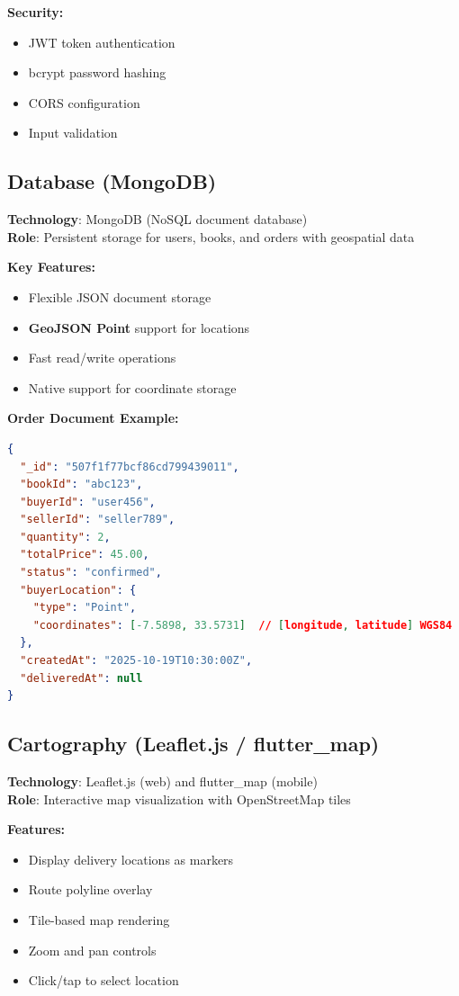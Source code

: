\documentclass[12pt,a4paper]{article}
\begin{document}
\textbf{Security:}
\begin{itemize}
    \item JWT token authentication
    \item bcrypt password hashing
    \item CORS configuration
    \item Input validation
\end{itemize}

\subsection{Database (MongoDB)}

\textbf{Technology}: MongoDB (NoSQL document database)\\
\textbf{Role}: Persistent storage for users, books, and orders with geospatial data

\textbf{Key Features:}
\begin{itemize}
    \item Flexible JSON document storage
    \item \textbf{GeoJSON Point} support for locations
    \item Fast read/write operations
    \item Native support for coordinate storage
\end{itemize}

\textbf{Order Document Example:}
\begin{lstlisting}[language=json, caption={MongoDB Order Document}]
{
  "_id": "507f1f77bcf86cd799439011",
  "bookId": "abc123",
  "buyerId": "user456",
  "sellerId": "seller789",
  "quantity": 2,
  "totalPrice": 45.00,
  "status": "confirmed",
  "buyerLocation": {
    "type": "Point",
    "coordinates": [-7.5898, 33.5731]  // [longitude, latitude] WGS84
  },
  "createdAt": "2025-10-19T10:30:00Z",
  "deliveredAt": null
}
\end{lstlisting}

\subsection{Cartography (Leaflet.js / flutter\_map)}

\textbf{Technology}: Leaflet.js (web) and flutter\_map (mobile)\\
\textbf{Role}: Interactive map visualization with OpenStreetMap tiles

\textbf{Features:}
\begin{itemize}
    \item Display delivery locations as markers
    \item Route polyline overlay
    \item Tile-based map rendering
    \item Zoom and pan controls
    \item Click/tap to select location
\end{itemize}
\end{document}
